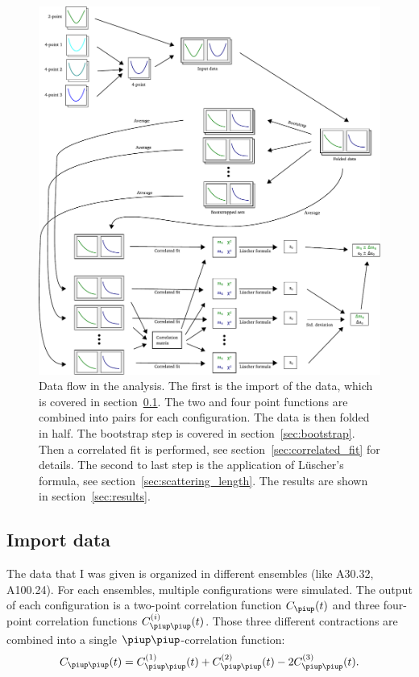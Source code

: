 \documentclass[11pt, english, fleqn, DIV=15, headinclude]{scrartcl}
\begin{document}
\begin{figure}[htbp]
    \centering
    \includegraphics[width=\linewidth]{sketches/Zeichnung.pdf}
    \caption{%
        Data flow in the analysis. The first is the import of the data, which
        is covered in section~\ref{sec:import}. The two and four point
        functions are combined into pairs for each configuration. The data is
        then folded in half. The bootstrap step is covered in
        section~\ref{sec:bootstrap}. Then a correlated fit is performed, see
        section~\ref{sec:correlated_fit} for details. The second to last step
        is the application of Lüscher's formula, see
        section~\ref{sec:scattering_length}. The results are shown in
        section~\ref{sec:results}.
    }
    \label{fig:analysis-flow}
\end{figure}


\subsection{Import data}
\label{sec:import}

The data that I was given is organized in different ensembles (like A30.32,
A100.24). For each ensembles, multiple configurations were simulated. The
output of each configuration is a two-point correlation function $C_\piup(t)$
and three four-point correlation functions $C_{\piup\piup}^{(i)}(t)$. Those
three different contractions are combined into a single
$\piup\piup$-correlation function:
\begin{equation}
    C_{\piup\piup}(t) = C_{\piup\piup}^{(1)}(t) + C_{\piup\piup}^{(2)}(t)
    - 2 C_{\piup\piup}^{(3)}(t).
\end{equation}
\end{document}
